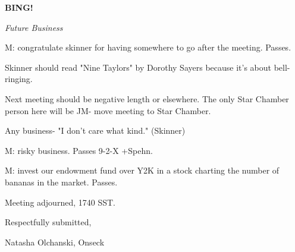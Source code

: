 \documentclass[12pt]{article}
\newcommand{\bing}{{\bf BING!} }
\newcommand{\goto}[1]{\bing \vskip 12pt \centerline{{\em{#1}}}}
\begin{document}
\goto{Future Business}

M: congratulate skinner for having somewhere to go after the meeting. Passes.

Skinner should read "Nine Taylors" by Dorothy Sayers because it's about bell-ringing.

Next meeting should be negative length or elsewhere. The only Star Chamber person here will be JM- move meeting to Star Chamber.

Any business- "I don't care what kind." (Skinner)

M: risky business. Passes 9-2-X +Spehn.

M: invest our endowment fund over Y2K in a stock charting the number of bananas in the market. Passes.

\vspace{12pt}

\noindent
Meeting adjourned, 1740 SST.

\vspace{18pt}

\centerline{Respectfully submitted,}
\centerline{Natasha Olchanski, Onseck}
\end{document}
